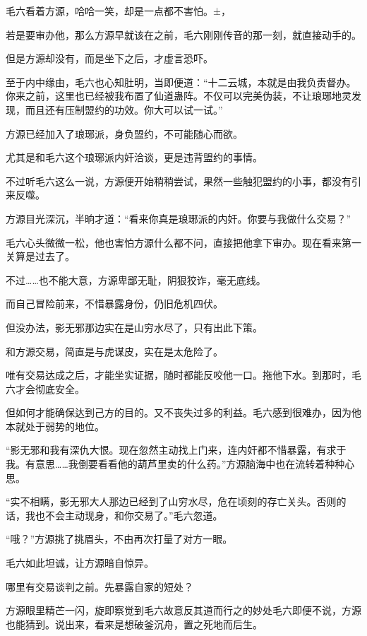 
\begin{this_body}



毛六看着方源，哈哈一笑，却是一点都不害怕。±，

若是要审办他，那么方源早就该在之前，毛六刚刚传音的那一刻，就直接动手的。

但是方源却没有，而是坐下之后，才虚言恐吓。

至于内中缘由，毛六也心知肚明，当即便道：“十二云城，本就是由我负责督办。你来之前，这里也已经被我布置了仙道蛊阵。不仅可以完美伪装，不让琅琊地灵发现，而且还有压制盟约的功效。你大可以试一试。”

方源已经加入了琅琊派，身负盟约，不可能随心而欲。

尤其是和毛六这个琅琊派内奸洽谈，更是违背盟约的事情。

不过听毛六这么一说，方源便开始稍稍尝试，果然一些触犯盟约的小事，都没有引来反噬。

方源目光深沉，半晌才道：“看来你真是琅琊派的内奸。你要与我做什么交易？”

毛六心头微微一松，他也害怕方源什么都不问，直接把他拿下审办。现在看来第一关算是过去了。

不过……也不能大意，方源卑鄙无耻，阴狠狡诈，毫无底线。

而自己冒险前来，不惜暴露身份，仍旧危机四伏。

但没办法，影无邪那边实在是山穷水尽了，只有出此下策。

和方源交易，简直是与虎谋皮，实在是太危险了。

唯有交易达成之后，才能坐实证据，随时都能反咬他一口。拖他下水。到那时，毛六才会彻底安全。

但如何才能确保达到己方的目的。又不丧失过多的利益。毛六感到很难办，因为他本就处于弱势的地位。

“影无邪和我有深仇大恨。现在忽然主动找上门来，连内奸都不惜暴露，有求于我。有意思……我倒要看看他的葫芦里卖的什么药。”方源脑海中也在流转着种种心思。

“实不相瞒，影无邪大人那边已经到了山穷水尽，危在顷刻的存亡关头。否则的话，我也不会主动现身，和你交易了。”毛六忽道。

“哦？”方源挑了挑眉头，不由再次打量了对方一眼。

毛六如此坦诚，让方源暗自惊异。

哪里有交易谈判之前。先暴露自家的短处？

方源眼里精芒一闪，旋即察觉到毛六故意反其道而行之的妙处毛六即便不说，方源也能猜到。说出来，看来是想破釜沉舟，置之死地而后生。


\end{this_body}
